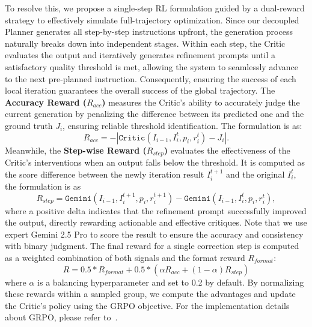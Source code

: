 \documentclass{article} %
\begin{document}
To resolve this, we propose a single-step RL formulation guided by a dual-reward strategy to effectively simulate full-trajectory optimization. Since our decoupled Planner generates all step-by-step instructions upfront, the generation process naturally breaks down into independent stages. Within each step, the Critic evaluates the output and iteratively generates refinement prompts until a satisfactory quality threshold is met, allowing the system to seamlessly advance to the next pre-planned instruction. Consequently, ensuring the success of each local iteration guarantees the overall success of the global trajectory. The \textbf{Accuracy Reward ($R_{acc}$)} measures the Critic's ability to accurately judge the current generation by penalizing the difference between its predicted one and the ground truth $J_i$, ensuring reliable threshold identification. The formulation is as:
\begin{equation}
    R_{acc} = -|\texttt{Critic}\left(I_{i-1}, I_i^t, p_i, r_i^t\right) - J_i|.
\end{equation}
Meanwhile, the \textbf{Step-wise Reward ($R_{step}$)} evaluates the effectiveness of the Critic's interventions when an output falls below the threshold. It is computed as the score difference between the newly iteration result $I_i^{t+1}$ and the original $I_i^t$, the formulation is as
\begin{equation}
    R_{step} = \texttt{Gemini}\left(I_{i-1}, I_i^{t+1}, p_i, r_i^{t+1}\right) - \texttt{Gemini}\left(I_{i-1}, I_i^t, p_i, r_i^t\right),
\end{equation}
where a positive delta indicates that the refinement prompt successfully improved the output, directly rewarding actionable and effective critiques. Note that we use expert Gemini 2.5 Pro to score the result to ensure the accuracy and consistency with binary judgment.
The final reward for a single correction step is computed as a weighted combination of both signals and the format reward $R_{format}$:
\begin{equation}
    R = 0.5 * R_{format} + 0.5 * (\alpha R_{acc} + (1 - \alpha) R_{step})
\end{equation}
where $\alpha$ is a balancing hyperparameter and set to 0.2 by default. By normalizing these rewards within a sampled group, we compute the advantages and update the Critic's policy using the GRPO objective. For the implementation details about GRPO, please refer to~\cite{guo2025deepseek}.
\end{document}
